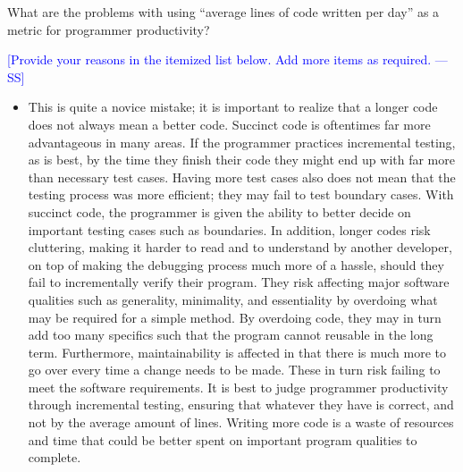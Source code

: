 \documentclass[12pt,fleqn]{examtst}
\newcommand{\authornote}[3]{\textcolor{#1}{[#3 ---#2]}}
\newcommand{\authornote}[3]{}
\newcommand{\wss}[1]{\authornote{blue}{SS}{#1}}
\begin{document}

\renewcommand{\labelenumi}{\Alph{enumi}.}

\newpage


 What are the problems with using ``average lines of code
written per day'' as a metric for programmer productivity?

\bigskip

\noindent \wss{Provide your reasons in the itemized list below.  Add more items
  as required.}

\begin{itemize}
\item This is quite a novice mistake; it is important to realize that a longer code does not always mean a better code. Succinct code is oftentimes far more advantageous in many areas. If the programmer practices incremental testing, as is best, by the time they finish their code they might end up with far more than necessary test cases. Having more test cases also does not mean that the testing process was more efficient; they may fail to test boundary cases. With succinct code, the programmer is given the ability to better decide on important testing cases such as boundaries. In addition, longer codes risk cluttering, making it harder to read and to understand by another developer, on top of making the debugging process much more of a hassle, should they fail to incrementally verify their program. They risk affecting major software qualities such as generality, minimality, and essentiality by overdoing what may be required for a simple method. By overdoing code, they may in turn add too many specifics such that the program cannot reusable in the long term. Furthermore, maintainability is affected in that there is much more to go over every time a change needs to be made. These in turn risk failing to meet the software requirements. It is best to judge programmer productivity through incremental testing, ensuring that whatever they have is correct, and not by the average amount of lines. Writing more code is a waste of resources and time that could be better spent on important program qualities to complete. 

\end{itemize}

\end{document}
